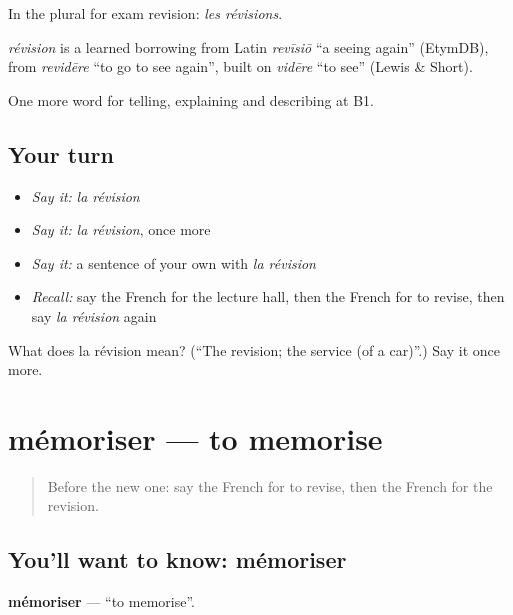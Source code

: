 In the plural for exam revision: \emph{les révisions}.

\begin{cousinweb}
\emph{révision} is a learned borrowing from Latin \emph{revīsiō} \textquotedblleft{}a seeing again\textquotedblright{} (EtymDB), from \emph{revidēre} \textquotedblleft{}to go to see again\textquotedblright{}, built on \emph{vidēre} \textquotedblleft{}to see\textquotedblright{} (Lewis \& Short).
\end{cousinweb}

\begin{grammarlens}[title={What you've built}]
One more word for telling, explaining and describing at B1.
\end{grammarlens}

\subsection*{Your turn}
\begin{itemize}
\raggedright
  \item \emph{Say it:} \emph{la révision}
  \item \emph{Say it:} \emph{la révision}, once more
  \item \emph{Say it:} a sentence of your own with \emph{la révision}
  \item \emph{Recall:} say the French for the lecture hall, then the French for to revise, then say \emph{la révision} again
\end{itemize}

\begin{tcolorbox}[breakable,colback=teal!4,colframe=teal!35!black,title={Before you move on}]
What does la révision mean? (\textquotedblleft{}The revision; the service (of a car)\textquotedblright{}.) Say it once more.
\end{tcolorbox}
\section[mémoriser]{mémoriser — to memorise}

\label{lesson:FR-C377-memoriser}



\begin{quote}
Before the new one: say the French for to revise, then the French for the revision.
\end{quote}

\subsection*{You'll want to know: mémoriser}
\textbf{mémoriser} — \textquotedblleft{}to memorise\textquotedblright{}.

